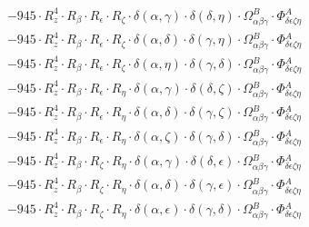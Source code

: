 \documentclass{article}
\begin{document}
\begin{equation}
\begin{array}{c}
 \\[0.2em] 		 - 945 \cdot R_{z}^{4} \cdot R_{\beta{}} \cdot R_{\epsilon{}} \cdot R_{\zeta{}} \cdot \delta{}\left(\alpha{}, \gamma{}\right) \cdot \delta{}\left(\delta{}, \eta{}\right) \cdot \Omega{}^{B}_{\alpha{}\beta{}\gamma{}} \cdot \Phi{}^{A}_{\delta{}\epsilon{}\zeta{}\eta{}} 
 \\[0.2em] 		 - 945 \cdot R_{z}^{4} \cdot R_{\beta{}} \cdot R_{\epsilon{}} \cdot R_{\zeta{}} \cdot \delta{}\left(\alpha{}, \delta{}\right) \cdot \delta{}\left(\gamma{}, \eta{}\right) \cdot \Omega{}^{B}_{\alpha{}\beta{}\gamma{}} \cdot \Phi{}^{A}_{\delta{}\epsilon{}\zeta{}\eta{}} 
 \\[0.2em] 		 - 945 \cdot R_{z}^{4} \cdot R_{\beta{}} \cdot R_{\epsilon{}} \cdot R_{\zeta{}} \cdot \delta{}\left(\alpha{}, \eta{}\right) \cdot \delta{}\left(\gamma{}, \delta{}\right) \cdot \Omega{}^{B}_{\alpha{}\beta{}\gamma{}} \cdot \Phi{}^{A}_{\delta{}\epsilon{}\zeta{}\eta{}} 
 \\[0.2em] 		 - 945 \cdot R_{z}^{4} \cdot R_{\beta{}} \cdot R_{\epsilon{}} \cdot R_{\eta{}} \cdot \delta{}\left(\alpha{}, \gamma{}\right) \cdot \delta{}\left(\delta{}, \zeta{}\right) \cdot \Omega{}^{B}_{\alpha{}\beta{}\gamma{}} \cdot \Phi{}^{A}_{\delta{}\epsilon{}\zeta{}\eta{}} 
 \\[0.2em] 		 - 945 \cdot R_{z}^{4} \cdot R_{\beta{}} \cdot R_{\epsilon{}} \cdot R_{\eta{}} \cdot \delta{}\left(\alpha{}, \delta{}\right) \cdot \delta{}\left(\gamma{}, \zeta{}\right) \cdot \Omega{}^{B}_{\alpha{}\beta{}\gamma{}} \cdot \Phi{}^{A}_{\delta{}\epsilon{}\zeta{}\eta{}} 
 \\[0.2em] 		 - 945 \cdot R_{z}^{4} \cdot R_{\beta{}} \cdot R_{\epsilon{}} \cdot R_{\eta{}} \cdot \delta{}\left(\alpha{}, \zeta{}\right) \cdot \delta{}\left(\gamma{}, \delta{}\right) \cdot \Omega{}^{B}_{\alpha{}\beta{}\gamma{}} \cdot \Phi{}^{A}_{\delta{}\epsilon{}\zeta{}\eta{}} 
 \\[0.2em] 		 - 945 \cdot R_{z}^{4} \cdot R_{\beta{}} \cdot R_{\zeta{}} \cdot R_{\eta{}} \cdot \delta{}\left(\alpha{}, \gamma{}\right) \cdot \delta{}\left(\delta{}, \epsilon{}\right) \cdot \Omega{}^{B}_{\alpha{}\beta{}\gamma{}} \cdot \Phi{}^{A}_{\delta{}\epsilon{}\zeta{}\eta{}} 
 \\[0.2em] 		 - 945 \cdot R_{z}^{4} \cdot R_{\beta{}} \cdot R_{\zeta{}} \cdot R_{\eta{}} \cdot \delta{}\left(\alpha{}, \delta{}\right) \cdot \delta{}\left(\gamma{}, \epsilon{}\right) \cdot \Omega{}^{B}_{\alpha{}\beta{}\gamma{}} \cdot \Phi{}^{A}_{\delta{}\epsilon{}\zeta{}\eta{}} 
 \\[0.2em] 		 - 945 \cdot R_{z}^{4} \cdot R_{\beta{}} \cdot R_{\zeta{}} \cdot R_{\eta{}} \cdot \delta{}\left(\alpha{}, \epsilon{}\right) \cdot \delta{}\left(\gamma{}, \delta{}\right) \cdot \Omega{}^{B}_{\alpha{}\beta{}\gamma{}} \cdot \Phi{}^{A}_{\delta{}\epsilon{}\zeta{}\eta{}} 

\end{array}
\end{equation}
\end{document}
